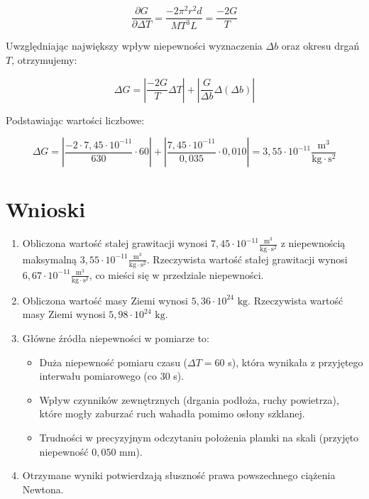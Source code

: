 \documentclass[a4paper,12pt]{article}
\begin{document}
\begin{equation*}
\frac{\partial G}{\partial \Delta T} = \frac{-2\pi^2 r^2 d}{MT^3L} = \frac{-2G}{T}
\end{equation*}

Uwzględniając największy wpływ niepewności wyznaczenia $\Delta b$ oraz okresu drgań $T$, otrzymujemy:

\begin{equation*}
\Delta G = | \frac{-2G}{T} \Delta T | + | \frac{G}{\Delta b} \Delta( \Delta b ) |
\end{equation*}

Podstawiając wartości liczbowe:

\begin{equation*}
\Delta G = | \frac{-2 \cdot 7{,}45 \cdot 10^{-11}}{630} \cdot 60 | + | \frac{7{,}45 \cdot 10^{-11}}{0{,}035} \cdot 0{,}010 |
= 3{,}55 \cdot 10^{-11} \frac{\text{m}^3}{\text{kg} \cdot \text{s}^2}
\end{equation*}



\section{Wnioski}

\begin{enumerate}
    \item Obliczona wartość stałej grawitacji wynosi $7{,}45 \cdot 10^{-11} \frac{\text{m}^3}{\text{kg} \cdot \text{s}^2}$ z niepewnością maksymalną $3{,}55 \cdot 10^{-11} \frac{\text{m}^3}{\text{kg} \cdot \text{s}^2}$. Rzeczywista wartość stałej grawitacji wynosi $6{,}67 \cdot 10^{-11} \frac{\text{m}^3}{\text{kg} \cdot \text{s}^2}$, co mieści się w przedziale niepewności.

    \item Obliczona wartość masy Ziemi wynosi $5{,}36 \cdot 10^{24} \text{ kg}$. Rzeczywista wartość masy Ziemi wynosi $5{,}98 \cdot 10^{24} \text{ kg}$.

    \item Główne źródła niepewności w pomiarze to:
    \begin{itemize}
        \item Duża niepewność pomiaru czasu ($\Delta T = 60$ s), która wynikała z przyjętego interwału pomiarowego (co 30 s).
        \item Wpływ czynników zewnętrznych (drgania podłoża, ruchy powietrza), które mogły zaburzać ruch wahadła pomimo osłony szklanej.
        \item Trudności w precyzyjnym odczytaniu położenia plamki na skali (przyjęto niepewność $0{,}050$ mm).
    \end{itemize}

    \item Otrzymane wyniki potwierdzają słuszność prawa powszechnego ciążenia Newtona.
\end{enumerate}
\newpage
\end{document}
